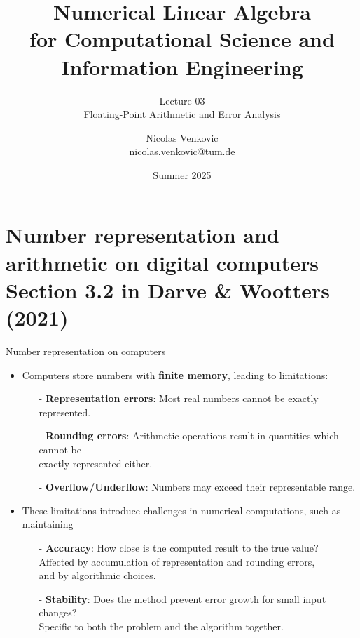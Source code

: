 \documentclass[t,usepdftitle=false]{beamer}
\title[NLA for CS and IE -- Lecture 03]{Numerical Linear Algebra\\for Computational Science and Information Engineering}
\subtitle{\vspace{.3cm}Lecture 03\\Floating-Point Arithmetic and Error Analysis}
\date[Summer 2025]{Summer 2025}
\author[nicolas.venkovic@tum.de]{Nicolas Venkovic\\{\small nicolas.venkovic@tum.de}}
\institute[]{Group of Computational Mathematics\\School of Computation, Information and Technology\\Technical University of Munich}
\begin{document}
	
\begin{frame}
	\maketitle
\end{frame}
	
\myoutlineframe
	
\section{Number representation and arithmetic on digital computers\\{\small Section 3.2 in Darve \& Wootters (2021)}}


\begin{frame}{Number representation on computers} 
\begin{itemize} 
\item Computers store numbers with \textbf{finite memory}, leading to limitations:
\begin{itemize}
\item[-] \textbf{Representation errors}: Most real numbers cannot be exactly represented.\vspace{.1cm}
\item[-] \textbf{Rounding errors}: Arithmetic operations result in quantities which cannot be\\
\hspace{2.8cm}exactly represented either.\vspace{.1cm}
\item[-] \textbf{Overflow/Underflow}: Numbers may exceed their representable range.\vspace{.1cm}
\end{itemize}
\item These limitations introduce challenges in numerical computations, such as maintaining
\begin{itemize}
\item[-] \textbf{Accuracy}: How close is the computed result to the true value?\\
\hspace{1.7cm}Affected by accumulation of representation and rounding errors,\\
\hspace{1.7cm}and by algorithmic choices.
\item[-] \textbf{Stability}: Does the method prevent error growth for small input changes?\\
\hspace{1.58cm}Specific to both the problem and the algorithm together.

\end{itemize}
\end{itemize}
\end{frame}
\end{document}

